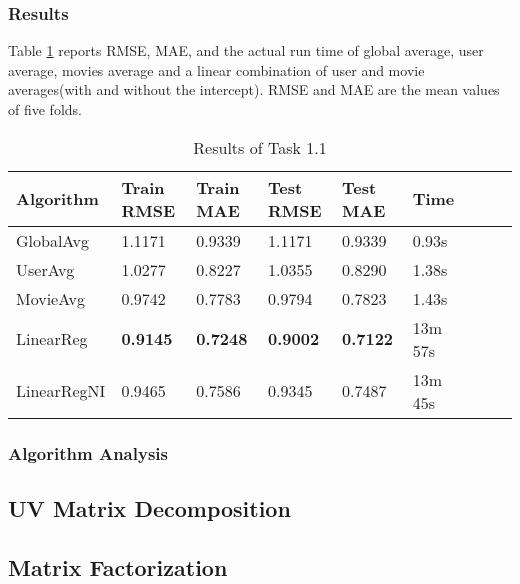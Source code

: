 \documentclass[12pt]{article}
\begin{document}
\subsubsection{Results}
Table \ref{tab:1.1-results} reports RMSE, MAE, and the actual run time of global average, user average, movies average and a linear combination of user and movie averages(with and without the intercept). RMSE and MAE are the mean values of five folds.
\begin{table}[ht]
    \centering
    \caption{Results of Task 1.1}
    \label{tab:1.1-results}
    \begin{threeparttable}
    \begin{tabular}{lllllllll}
        \toprule
        \textbf{Algorithm}  & \textbf{Train RMSE} & \textbf{Train MAE} & \textbf{Test RMSE} & \textbf{Test MAE} & \textbf{Time}\\
        \midrule
        GlobalAvg & 1.1171 & 0.9339 & 1.1171 & 0.9339 & 0.93s\\
        UserAvg & 1.0277 & 0.8227 & 1.0355 & 0.8290 & 1.38s\\
        MovieAvg & 0.9742 & 0.7783 & 0.9794 & 0.7823 & 1.43s\\
        LinearReg & \textbf{0.9145} & \textbf{0.7248} & \textbf{0.9002} & \textbf{0.7122} & 13m 57s\\
        LinearRegNI & 0.9465 & 0.7586 & 0.9345 & 0.7487 & 13m 45s\\
        \bottomrule
    \end{tabular}
    \end{threeparttable}
\end{table}

\subsubsection{Algorithm Analysis}

\subsection{UV Matrix Decomposition}

\subsection{Matrix Factorization}
\end{document}
